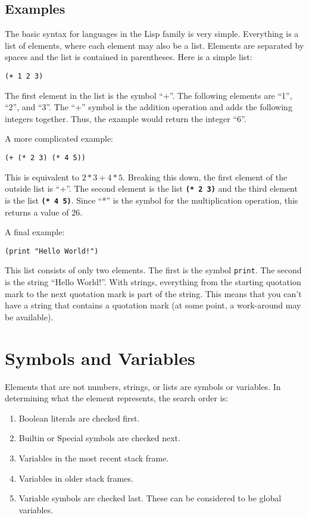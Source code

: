 \documentclass[10pt, openany]{book}
\newcommand{\operation}[1]{\textbf{\texttt{#1}}}
\newcommand{\function}[1]{\texttt{#1}}
\begin{document}
\subsection{Examples}
The basic syntax for languages in the Lisp family is very simple.  Everything is a list of elements, where each element may also be a list.  Elements are separated by spaces and the list is contained in parentheses.  Here is a simple list:
\lstset{language=[Tiny]Lisp}
\begin{lstlisting}
(+ 1 2 3)
\end{lstlisting}
The first element in the list is the symbol ``+''.  The following elements are ``1'', ``2'', and ``3''.  The ``+'' symbol is the addition operation and adds the following integers together.  Thus, the example would return the integer ``6''.

A more complicated example:
\begin{lstlisting}
(+ (* 2 3) (* 4 5))
\end{lstlisting}
This is equivalent to $2*3+4*5$.  Breaking this down, the first element of the outside list is ``+''.  The second element is the list \operation{(* 2 3)} and the third element is the list \operation{(* 4 5)}.  Since ``*'' is the symbol for the multiplication operation, this returns a value of 26.

A final example:
\begin{lstlisting}
(print "Hello World!")
\end{lstlisting}
This list consists of only two elements.  The first is the symbol \function{print}.  The second is the string ``Hello World!''.  With strings, everything from the starting quotation mark to the next quotation mark is part of the string.  This means that you can't have a string that contains a quotation mark (at some point, a work-around may be available).

\section{Symbols and Variables}
Elements that are not numbers, strings, or lists are symbols or variables.  In determining what the element represents, the search order is:
\begin{enumerate}
  \item Boolean literals are checked first.
  \item Builtin or Special symbols are checked next.
  \item Variables in the most recent stack frame.
  \item Variables in older stack frames.
  \item Variable symbols are checked last.  These can be considered to be global variables.
\end{enumerate}
\end{document}
